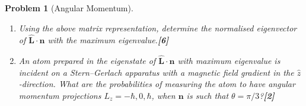 \documentclass[a4paper]{article}
\theoremstyle{new}
\newtheorem{qns}{Problem}[subsection]
\begin{document}
\begin{qns}[Angular Momentum]
\begin{enumerate}[label=(\roman*)]
\item Using the above matrix representation, determine the normalised eigenvector of $\hat{\mathbf{L}}\cdot\mathbf{n}$ with the maximum eigenvalue.\hfill\textbf{[6]}
\item An atom prepared in the eigenstate of $\hat{\mathbf{L}}\cdot\mathbf{n}$ with maximum eigenvalue is incident on a Stern–Gerlach apparatus with a magnetic field gradient in the $\hat{z}$-direction. What are the probabilities of measuring the atom to have angular momentum projections $L_z = −\hbar, 0, \hbar$, when $\mathbf{n}$ is such that $\theta=\pi/3$?\hfill\textbf{[2]}
\end{enumerate}
\begin{mdframed}
\end{mdframed}
\end{qns}
\newpage
\end{document}
